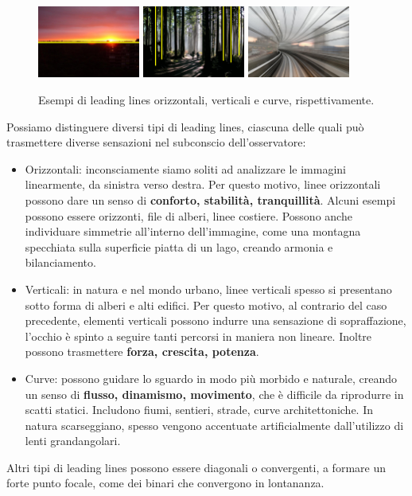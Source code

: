 \begin{figure}[b]
    \centering
    \includegraphics[width=0.3\textwidth]{Immagini/Introduzione/sunset_horizontal.png}
    \quad
    \includegraphics[width=0.3\textwidth]{Immagini/Introduzione/vertical.png}
    \quad
    \includegraphics[width=0.3\textwidth]{Immagini/Introduzione/curved2.jpg}
    \caption{Esempi di leading lines orizzontali, verticali e curve, rispettivamente.}
    \label{fig:leading_lines}
\end{figure}

Possiamo distinguere diversi tipi di leading lines, ciascuna delle quali può trasmettere diverse sensazioni nel subconscio dell'osservatore:
\begin{itemize}
    \item Orizzontali: inconsciamente siamo soliti ad analizzare le immagini linearmente, da sinistra verso destra. Per questo motivo, linee orizzontali possono dare un senso di \textbf{conforto, stabilità, tranquillità}. Alcuni esempi possono essere orizzonti, file di alberi, linee costiere. Possono anche individuare simmetrie all'interno dell'immagine, come una montagna specchiata sulla superficie piatta di un lago, creando armonia e bilanciamento.
    \item Verticali: in natura e nel mondo urbano, linee verticali spesso si presentano sotto forma di alberi e alti edifici. Per questo motivo, al contrario del caso precedente, elementi verticali possono indurre una sensazione di sopraffazione, l'occhio è spinto a seguire tanti percorsi in maniera non lineare. Inoltre possono trasmettere \textbf{forza, crescita, potenza}.
    \item Curve: possono guidare lo sguardo in modo più morbido e naturale, creando un senso di \textbf{flusso, dinamismo, movimento}, che è difficile da riprodurre in scatti statici. Includono fiumi, sentieri, strade, curve architettoniche. In natura scarseggiano, spesso vengono accentuate artificialmente dall'utilizzo di lenti grandangolari.
\end{itemize}
Altri tipi di leading lines possono essere diagonali o convergenti, a formare un forte punto focale, come dei binari che convergono in lontananza.

